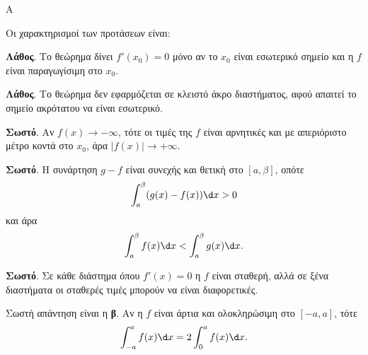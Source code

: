 \begin{thema}{Α}
\begin{erwthma}
\item {}

\item {}

\item {}

\item Οι χαρακτηρισμοί των προτάσεων είναι:
\begin{alist}
\item \textbf{Λάθος}. Το θεώρημα  δίνει $f'(x_0)=0$ μόνο αν το $x_0$ είναι εσωτερικό σημείο και η $f$ είναι παραγωγίσιμη στο $x_0$.
\item \textbf{Λάθος}. Το θεώρημα  δεν εφαρμόζεται σε κλειστό άκρο διαστήματος, αφού απαιτεί το σημείο ακρότατου να είναι εσωτερικό.
\item \textbf{Σωστό}. Αν $f(x)\to-\infty$, τότε οι τιμές της $f$ είναι αρνητικές και με απεριόριστο μέτρο κοντά στο $x_0$, άρα $|f(x)|\to+\infty$.
\item \textbf{Σωστό}. Η συνάρτηση $g-f$ είναι συνεχής και θετική στο $[a,\beta]$, οπότε
\[ \dint_a^\beta (g(x)-f(x))\d x>0 \]
και άρα
\[ \dint_a^\beta f(x)\d x<\dint_a^\beta g(x)\d x. \]
\item \textbf{Σωστό}. Σε κάθε διάστημα όπου $f'(x)=0$ η $f$ είναι σταθερή, αλλά σε ξένα διαστήματα οι σταθερές τιμές μπορούν να είναι διαφορετικές.
\end{alist}

\item Σωστή απάντηση είναι η \textbf{β}. Αν η $f$ είναι άρτια και ολοκληρώσιμη στο $[-a,a]$, τότε
\[ \dint_{-a}^{a} f(x)\d x=2\dint_0^a f(x)\d x. \]
\end{erwthma}
\end{thema}

